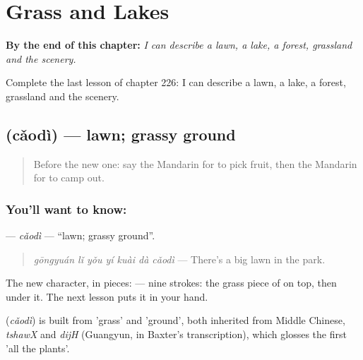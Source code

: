 
\chapter{Grass and Lakes}
\label{ch:zh-grass-and-lakes}

\begin{chapteropening}
\textbf{By the end of this chapter:} \emph{I can describe a lawn, a lake, a forest, grassland and the scenery.}

Complete the last lesson of chapter 226: I can describe a lawn, a lake, a forest, grassland and the scenery.
\end{chapteropening}

\section[\texorpdfstring{\zh{草地} (cǎodì)}{草地 (cǎodì)}]{ (cǎodì) — lawn; grassy ground}

\label{lesson:ZH-C226-caodi}



\begin{quote}
Before the new one: say the Mandarin for to pick fruit, then the Mandarin for to camp out.
\end{quote}

\subsection*{You'll want to know: }
\textbf{} — \emph{cǎodì} — \textquotedblleft{}lawn; grassy ground\textquotedblright{}.

\begin{quote}
\emph{gōngyuán lǐ yǒu yí kuài dà cǎodì} — There's a big lawn in the park.
\end{quote}

The new character, in pieces:  — nine strokes: the grass piece of  on top, then  under it. The next lesson puts it in your hand.

\begin{cousinweb}
\textbf{} (\emph{cǎodì}) is built from  'grass' and  'ground', both inherited from Middle Chinese, \emph{tshawX} and \emph{dijH} (Guangyun, in Baxter's transcription), which glosses the first 'all the plants'.
\end{cousinweb}

